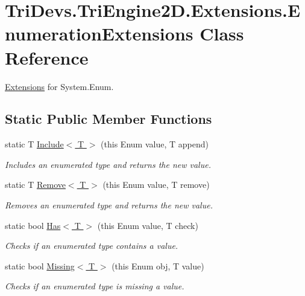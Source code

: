 \hypertarget{class_tri_devs_1_1_tri_engine2_d_1_1_extensions_1_1_enumeration_extensions}{\section{Tri\-Devs.\-Tri\-Engine2\-D.\-Extensions.\-Enumeration\-Extensions Class Reference}
\label{class_tri_devs_1_1_tri_engine2_d_1_1_extensions_1_1_enumeration_extensions}
}


\hyperlink{namespace_tri_devs_1_1_tri_engine2_d_1_1_extensions}{Extensions} for System.\-Enum.  


\subsection*{Static Public Member Functions}
\begin{DoxyCompactItemize}
\item 
static T \hyperlink{class_tri_devs_1_1_tri_engine2_d_1_1_extensions_1_1_enumeration_extensions_a4ffbe4d416dfcdb513b5e7c3da3ac4b8}{Include$<$ T $>$} (this Enum value, T append)
\begin{DoxyCompactList}\small\item\em Includes an enumerated type and returns the new value. \end{DoxyCompactList}\item 
static T \hyperlink{class_tri_devs_1_1_tri_engine2_d_1_1_extensions_1_1_enumeration_extensions_af84a3ba0fc3c15ba49f7a6d5a709b434}{Remove$<$ T $>$} (this Enum value, T remove)
\begin{DoxyCompactList}\small\item\em Removes an enumerated type and returns the new value. \end{DoxyCompactList}\item 
static bool \hyperlink{class_tri_devs_1_1_tri_engine2_d_1_1_extensions_1_1_enumeration_extensions_a47db055bf2d18ed0e2fff0438cf37bb0}{Has$<$ T $>$} (this Enum value, T check)
\begin{DoxyCompactList}\small\item\em Checks if an enumerated type contains a value. \end{DoxyCompactList}\item 
static bool \hyperlink{class_tri_devs_1_1_tri_engine2_d_1_1_extensions_1_1_enumeration_extensions_ae1c9bea90f49ced7862b67721190b3b6}{Missing$<$ T $>$} (this Enum obj, T value)
\begin{DoxyCompactList}\small\item\em Checks if an enumerated type is missing a value. \end{DoxyCompactList}\end{DoxyCompactItemize}


